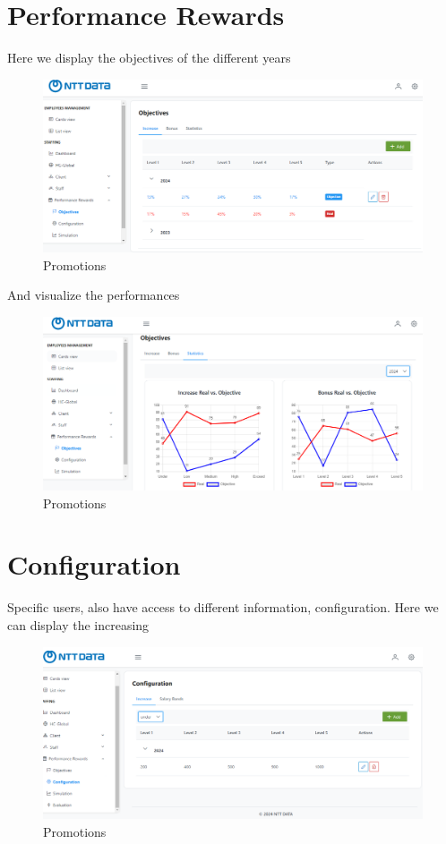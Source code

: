 \documentclass[12pt,a4paper,table,english]{article}
\begin{document}
	\section{Performance Rewards}
	
	Here we display the objectives of the different years
	\begin{figure}[H]
		\centering
		\includegraphics[width=150mm]{Image/performance}
		\caption{Promotions}
		\label{fig:Promotions}
	\end{figure}

	And visualize the performances
	\begin{figure}[H]
		\centering
		\includegraphics[width=150mm]{Image/performancegraph}
		\caption{Promotions}
		\label{fig:Promotions}
	\end{figure}

	\section{Configuration}
	
	Specific users, also have access to different information, configuration. Here we can display the increasing
	\begin{figure}[H]
		\centering
		\includegraphics[width=150mm]{Image/conf}
		\caption{Promotions}
		\label{fig:Promotions}
	\end{figure}
\end{document}
